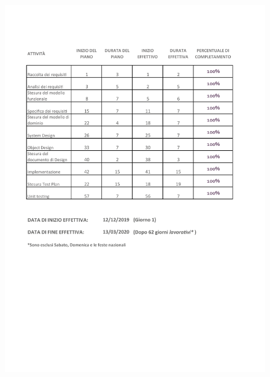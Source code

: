\begin{figure}[h]
    \centering
    \includegraphics[width=\textwidth]{solo tabella.pdf}
\end{figure}